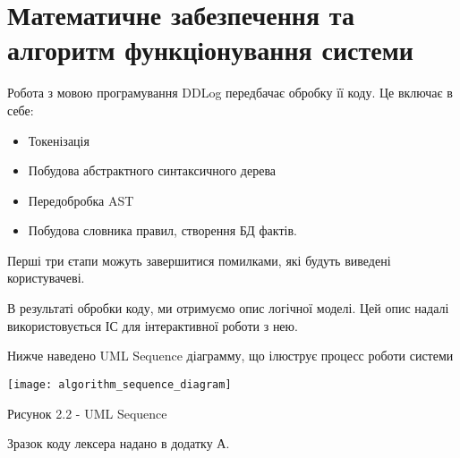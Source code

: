 \section{Математичне забезпечення та алгоритм функціонування системи}

Робота з мовою програмування DDLog передбачає обробку її коду. Це включає в себе:

\begin{itemize}
	\item Токенізація
	\item Побудова абстрактного синтаксичного дерева
	\item Передобробка AST
	\item Побудова словника правил, створення БД фактів.
\end{itemize}

Перші три єтапи можуть завершитися помилками, які будуть виведені користувачеві.

В результаті обробки коду, ми отримуємо опис логічної моделі. Цей опис надалі використовується ІС для інтерактивної роботи з нею.

Нижче наведено UML Sequence діаграмму, що ілюструє процесс роботи системи


\begin{center}

\texttt{[image: algorithm\_sequence\_diagram]}

Рисунок 2.2 - UML Sequence
\end{center}

Зразок коду лексера надано в додатку А.


